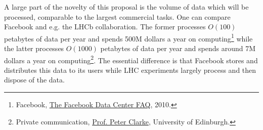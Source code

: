 A large part of the novelty of this proposal is the volume of data which will be processed, comparable to the largest commercial tasks. 
One can compare Facebook and e.g. the LHCb collaboration.
The former processes $O(100)$ petabytes of data per year and spends 500M dollars a year on computing\footnote{Facebook, \href{http://www.datacenterknowledge.com/the-facebook-data-center-faq-page-three/}{The Facebook Data Center FAQ}, 2010.} while the latter processes  $O(1000)$ petabytes of data per year and spends around 7M dollars a year on computing\footnote{Private communication, \href{mailto:peter.clarke@ed.ac.uk}{Prof. Peter Clarke}, University of Edinburgh.}.
The essential difference is that Facebook stores and distributes this data to its users while LHC experiments largely process and then dispose of the data.

